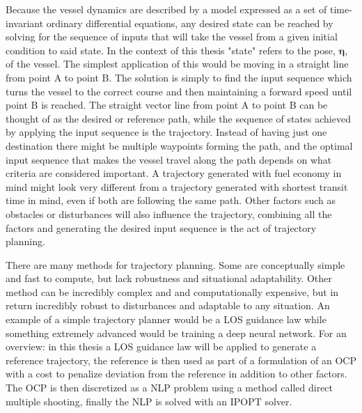 
Because the vessel dynamics are described by a model expressed as a set of time-invariant ordinary differential equations, any desired state
can be reached by solving for the sequence of inputs that will take the vessel from a given initial condition to said state. In the context of this
thesis "state" refers to the pose, $\bm{\eta}$, of the vessel. The simplest application of this would be moving in a straight line from point A to point B.
The solution is simply to find the input sequence which turns the vessel to the correct course and then maintaining a forward speed until point B is reached.
The straight vector line from point A to point B can be thought of as the desired or reference path, while the sequence of states achieved by applying the 
input sequence is the trajectory. Instead of having just one destination there might be multiple waypoints forming the path, and the optimal
input sequence that makes the vessel travel along the path depends on what criteria are considered important. A trajectory generated with fuel
economy in mind might look very different from a trajectory generated with shortest transit time in mind, even if both are following the same path.
Other factors such as obstacles or disturbances will also influence the trajectory, combining all the factors and generating the desired
input sequence is the act of trajectory planning.

There are many methods for trajectory planning. Some are conceptually simple and fast to compute, but lack robustness and situational adaptability.
Other method can be incredibly complex and and computationally expensive, but in return incredibly robust to disturbances and adaptable to
any situation. An example of a simple trajectory planner would be a \gls{LOS} guidance law while something extremely advanced would be training a deep
neural network. For an overview: in this thesis a \gls{LOS} guidance law will be applied to generate a reference trajectory, the reference is then used as part of a
formulation of an \gls{OCP} with a cost to penalize deviation from the reference in addition to other factors. The \gls{OCP} is then discretized
as a \gls{NLP} problem using a method called direct multiple shooting, finally the \gls{NLP} is solved with an \gls{IPOPT} solver.

